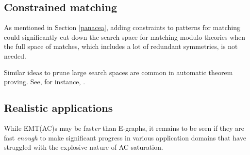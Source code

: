 \documentclass[12pt,a4paper,twoside,openright]{report}
\numberwithin{equation}{chapter}		%
\numberwithin{figure}{chapter}			%
\numberwithin{table}{chapter}			%
\theoremstyle{definition}
\theoremstyle{plain}
\begin{document}
\subsection{Constrained matching}

As mentioned in Section \ref{panacea}, adding constraints to patterns for matching could significantly cut down the search space for matching modulo theories when the full space of matches, which includes a lot of redundant symmetries, is not needed.

Similar ideas to prune large search spaces are common in automatic theorem proving. See, for instance, \cite[Chapter~7, Section~5]{robinson_handbook_2001}.

\subsection{Realistic applications}
While EMT(AC)s may be fast\emph{er} than E-graphs, it remains to be seen if they are fast \emph{enough} to make significant progress in various application domains that have struggled with the explosive nature of AC-saturation. 


\cleardoublepage
{} %
\printbibliography

\end{document}
